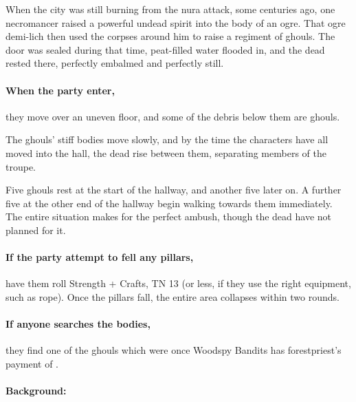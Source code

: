 \begin{multicols}{2}

\begin{exampletext}

When the city was still burning from the nura attack, some centuries ago, one necromancer raised a powerful undead spirit into the body of an ogre.
That ogre demi-lich then used the corpses around him to raise a regiment of ghouls.
The door was sealed during that time, peat-filled water flooded in, and the dead rested there, perfectly embalmed and perfectly still.

\end{exampletext}

\paragraph{When the party enter,}
they move over an uneven floor, and some of the debris below them are ghouls.

The ghouls' stiff bodies move slowly, and by the time the characters have all moved into the hall, the dead rise between them, separating members of the troupe.

Five ghouls rest at the start of the hallway, and another five later on.
A further five at the other end of the hallway begin walking towards them immediately.
The entire situation makes for the perfect ambush, though the dead have not planned for it.


\paragraph{If the party attempt to fell any pillars,}
have them roll Strength + Crafts, TN 13 (or less, if they use the right equipment, such as rope).
Once the pillars fall, the entire area collapses within two rounds.

\paragraph{If anyone searches the bodies,}
they find one of the ghouls which were once Woodspy Bandits has \gls{forestpriest}'s payment of \lootMedium.



\paragraph{Background:}


\end{multicols}
